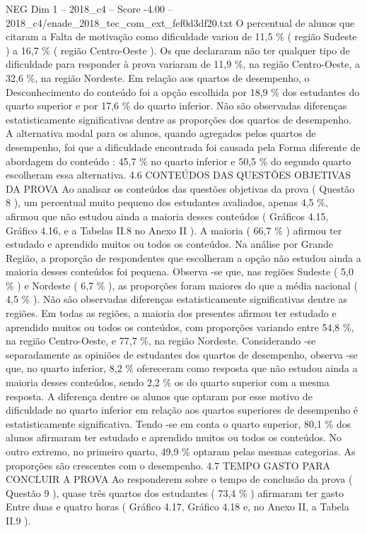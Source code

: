 \begin{textsample}{NEG Dim 1 – 2018\_c4 – Score -4.00 – 2018\_c4/enade\_2018\_tec\_com\_ext\_fef0d3df20.txt}
O percentual de alunos que citaram a Falta de motivação como dificuldade variou de 11,5 \% ( região Sudeste ) a 16,7 \% ( região Centro-Oeste ).
Os que declararam não ter qualquer tipo de dificuldade para responder à prova variaram de 11,9 \%, na região Centro-Oeste, a 32,6 \%, na região Nordeste.
Em relação aos quartos de desempenho, o Desconhecimento do conteúdo foi a opção escolhida por 18,9 \% dos estudantes do quarto superior e por 17,6 \% do quarto inferior.
Não são observadas diferenças estatisticamente significativas dentre as proporções dos quartos de desempenho.
A alternativa modal para os alunos, quando agregados pelos quartos de desempenho, foi que a dificuldade encontrada foi causada pela Forma diferente de abordagem do conteúdo : 45,7 \% no quarto inferior e 50,5 \% do segundo quarto escolheram essa alternativa. 4.6 CONTEÚDOS DAS QUESTÕES OBJETIVAS DA PROVA Ao analisar os conteúdos das questões objetivas da prova ( Questão 8 ), um percentual muito pequeno dos estudantes avaliados, apenas 4,5 \%, afirmou que não estudou ainda a maioria desses conteúdos ( Gráficos 4.15, Gráfico 4.16, e a Tabelas II.8 no Anexo II ).
A maioria ( 66,7 \% ) afirmou ter estudado e aprendido muitos ou todos os conteúdos.
Na análise por Grande Região, a proporção de respondentes que escolheram a opção não estudou ainda a maioria desses conteúdos foi pequena.
Observa -se que, nas regiões Sudeste ( 5,0 \% ) e Nordeste ( 6,7 \% ), as proporções foram maiores do que a média nacional ( 4,5 \% ).
Não são observadas diferenças estatisticamente significativas dentre as regiões.
Em todas as regiões, a maioria dos presentes afirmou ter estudado e aprendido muitos ou todos os conteúdos, com proporções variando entre 54,8 \%, na região Centro-Oeste, e 77,7 \%, na região Nordeste.
Considerando -se separadamente as opiniões de estudantes dos quartos de desempenho, observa -se que, no quarto inferior, 8,2 \% ofereceram como resposta que não estudou ainda a maioria desses conteúdos, sendo 2,2 \% os do quarto superior com a mesma resposta.
A diferença dentre os alunos que optaram por esse motivo de dificuldade no quarto inferior em relação aos quartos superiores de desempenho é estatisticamente significativa.
Tendo -se em conta o quarto superior, 80,1 \% dos alunos afirmaram ter estudado e aprendido muitos ou todos os conteúdos.
No outro extremo, no primeiro quarto, 49,9 \% optaram pelas mesmas categorias.
As proporções são crescentes com o desempenho. 4.7 TEMPO GASTO PARA CONCLUIR A PROVA Ao responderem sobre o tempo de conclusão da prova ( Questão 9 ), quase três quartos dos estudantes ( 73,4 \% ) afirmaram ter gasto Entre duas e quatro horas ( Gráfico 4.17, Gráfico 4.18 e, no Anexo II, a Tabela II.9 ).

\end{textsample}
